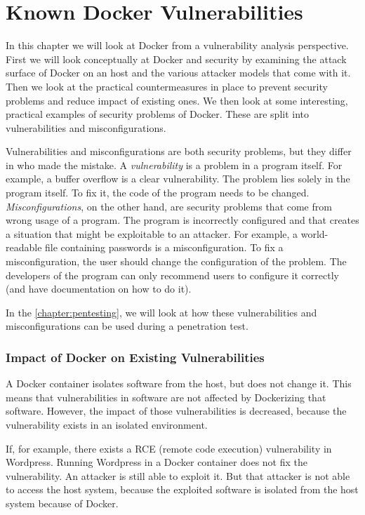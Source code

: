 \chapter{Known Docker Vulnerabilities}\label{chapter:vulnerabilities}
In this chapter we will look at Docker from a vulnerability analysis perspective. First we will look conceptually at Docker and security by examining the attack surface of Docker on an host and the various attacker models that come with it. Then we look at the practical countermeasures in place to prevent security problems and reduce impact of existing ones. We then look at some interesting, practical examples of security problems of Docker. These are split into vulnerabilities and misconfigurations.

\hfill

Vulnerabilities and misconfigurations are both security problems, but they differ in who made the mistake. A \emph{vulnerability} is a problem in a program itself. For example, a buffer overflow is a clear vulnerability. The problem lies solely in the program itself. To fix it, the code of the program needs to be changed. \emph{Misconfigurations}, on the other hand, are security problems that come from wrong usage of a program. The program is incorrectly configured and that creates a situation that might be exploitable to an attacker. For example, a world-readable file containing passwords is a misconfiguration. To fix a misconfiguration, the user should change the configuration of the problem. The developers of the program can only recommend users to configure it correctly (and have documentation on how to do it).

\hfill

In the \autoref{chapter:pentesting}, we will look at how these vulnerabilities and misconfigurations can be used during a penetration test.

\subsection*{Impact of Docker on Existing Vulnerabilities}
A Docker container isolates software from the host, but does not change it. This means that vulnerabilities in software are not affected by Dockerizing that software. However, the impact of those vulnerabilities is decreased, because the vulnerability exists in an isolated environment.

If, for example, there exists a RCE (remote code execution) vulnerability in Wordpress. Running Wordpress in a Docker container does not fix the vulnerability. An attacker is still able to exploit it. But that attacker is not able to access the host system, because the exploited software is isolated from the host system because of Docker.






